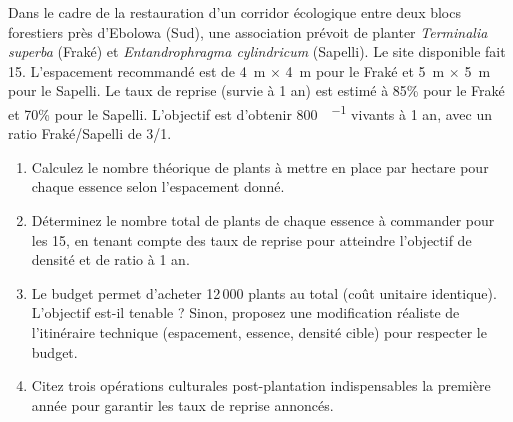 \documentclass[11pt]{article}
\begin{document}
\begin{exercice}
Dans le cadre de la restauration d'un corridor écologique entre deux blocs forestiers près d'Ebolowa (Sud), une association prévoit de planter \textit{Terminalia superba} (Fraké) et \textit{Entandrophragma cylindricum} (Sapelli). Le site disponible fait \SI{15}{}. L'espacement recommandé est de \SI{4}{\meter} $\times$ \SI{4}{\meter} pour le Fraké et \SI{5}{\meter} $\times$ \SI{5}{\meter} pour le Sapelli. Le taux de reprise (survie à 1 an) est estimé à 85\% pour le Fraké et 70\% pour le Sapelli. L'objectif est d'obtenir \SI{800}{\per{}} vivants à 1 an, avec un ratio Fraké/Sapelli de 3/1.

\begin{enumerate}
\item Calculez le nombre théorique de plants à mettre en place par hectare pour chaque essence selon l'espacement donné.
\item Déterminez le nombre total de plants de chaque essence à commander pour les \SI{15}{}, en tenant compte des taux de reprise pour atteindre l'objectif de densité et de ratio à 1 an.
\item Le budget permet d'acheter 12\,000 plants au total (coût unitaire identique). L'objectif est-il tenable ? Sinon, proposez une modification réaliste de l'itinéraire technique (espacement, essence, densité cible) pour respecter le budget.
\item Citez trois opérations culturales post-plantation indispensables la première année pour garantir les taux de reprise annoncés.
\end{enumerate}
\end{exercice}
\end{document}
